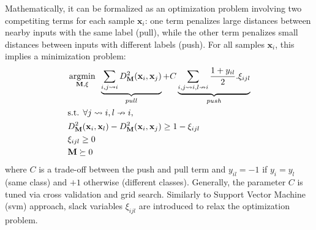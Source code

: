 %
Mathematically, it can be formalized as an optimization problem involving two competiting terms for each sample $\textbf{x}_i$: one term penalizes large distances between nearby inputs with the same label (pull), while the other term penalizes small distances between inputs with different labels (push). For all samples $\textbf{x}_i$, this implies a minimization problem:
\begin{equation}
\begin{aligned}
&\displaystyle 		\argmin_{\textbf{M},\xi} \text{  } \underbrace{
	\sum\limits_{i,j \rightsquigarrow i}
	D^2_\textbf{M}(\textbf{x}_i,\textbf{x}_j)
}_{pull}
+
C
\underbrace{
	\sum\limits_{i,j \rightsquigarrow i,l \nrightarrow i} \frac{1+y_{il}}{2}.\xi_{ijl}
}
_{push} \\
&\text{s.t.  } \forall j \rightsquigarrow i, l \nrightarrow i, \\
& D^2_\textbf{M}(\textbf{x}_i,\textbf{x}_l) - D^2_\textbf{M}(\textbf{x}_i,\textbf{x}_j)  \geq 1-\xi_{ijl} \\
& \xi_{ijl} \geq 0 \\
& \textbf{M} \succeq 0
\label{eq:OptimizationProblem}
\end{aligned}
\end{equation}
\noindent where $C$ is a trade-off between the push and pull term and $y_{il}=-1$ if $y_i=y_l$ (same class) and $+1$ otherwise (different classes). Generally, the parameter $C$ is tuned via cross validation and grid search. Similarly to Support Vector Machine ({\sc svm}) approach, slack variables $\xi_{ijl}$ are introduced to relax the optimization problem. 

